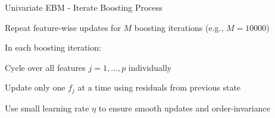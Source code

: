 \documentclass[10pt,compress,t,notes=noshow, xcolor=table]{beamer}
\begin{document}
\begin{framev}[align=top]{Univariate EBM - Iterate Boosting Process}
\spacer[0.25]
\begin{itemizeM}
\item Repeat feature-wise updates for $M$ boosting iterations (e.g., $M=10000$)
\item In each boosting iteration:
\begin{itemizeS}
\item Cycle over all features $j=1,\dots,p$ individually %
\item Update only one $f_j$ at a time using residuals from previous state
\end{itemizeS}
\item Use small learning rate $\eta$ to ensure smooth updates and order-invariance
\end{itemizeM}
\end{framev}















\end{document}
